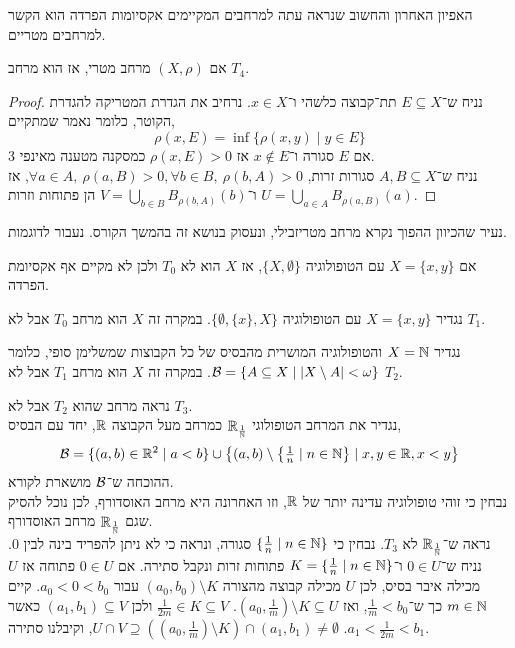 האפיון האחרון והחשוב שנראה עתה למרחבים המקיימים אקסיומות הפרדה הוא הקשר למרחבים מטריים.
\begin{proposition}
	אם $(X, \rho)$ מרחב מטרי, אז הוא מרחב $T_4$.
\end{proposition}
\begin{proof}
	נניח ש־$E \subseteq X$ תת־קבוצה כלשהי ו־$x \in X$.
	נרחיב את הגדרת המטריקה להגדרת הקוטר, כלומר נאמר שמתקיים,
	\[
		\rho(x, E) = \inf\{ \rho(x, y) \mid y \in E \}
	\]
	אם $E$ סגורה ו־$x \notin E$ אז $\rho(x, E) > 0$ כמסקנה מטענה מאינפי 3. \\
	נניח ש־$A, B \subseteq X$ סגורות זרות, $\forall a \in A,\ \rho(a, B) > 0, \forall b \in B,\ \rho(b, A) > 0$,
	אז $U = \bigcup_{a \in A} B_{\rho(a, B)}(a)$ ו־$V = \bigcup_{b \in B} B_{\rho(b, A)}(b)$ הן פתוחות וזרות.
\end{proof}
נעיר שהכיוון ההפוך נקרא מרחב מטריזבילי, ונעסוק בנושא זה בהמשך הקורס.
נעבור לדוגמות.
\begin{example}
	אם $X = \{x, y\}$ עם הטופולוגיה $\{X, \emptyset\}$, אז $X$ הוא לא $T_0$ ולכן לא מקיים אף אקסיומת הפרדה.
\end{example}
\begin{example}
	נגדיר $X = \{x, y\}$ עם הטופולוגיה $\{\emptyset, \{x\}, X\}$.
	במקרה זה $X$ הוא מרחב $T_0$ אבל לא $T_1$.
\end{example}
\begin{example}
	נגדיר $X = \mathbb{N}$ והטופולוגיה המושרית מהבסיס של כל הקבוצות שמשלימן סופי, כלומר $\mathcal{B} = \{ A \subseteq X \mid |X \setminus A| < \omega \}$.
	במקרה זה $X$ הוא מרחב $T_1$ אבל לא $T_2$.
\end{example}
\begin{example}
	נראה מרחב שהוא $T_2$ אבל לא $T_3$. \\
	נגדיר את המרחב הטופולוגי $\mathbb{R}_{\frac{1}{\mathbb{N}}}$ כמרחב מעל הקבוצה $\mathbb{R}$, יחד עם הבסיס,
	\[
		\mathcal{B}
		= \{ (a, b) \in \mathbb{R}^2 \mid a < b \}
		\cup \left\{ (a, b) \setminus \left\{ \textstyle\frac{1}{n} \mid n \in \mathbb{N} \right\} \mid x, y \in \mathbb{R}, x < y \right\}
	\]
	ההוכחה ש־$\mathcal{B}$ מושארת לקורא. \\
	נבחין כי זוהי טופולוגיה עדינה יותר של $\mathbb{R}$, וזו האחרונה היא מרחב האוסדורף, לכן נוכל להסיק שגם $\mathbb{R}_{\frac{1}{\mathbb{N}}}$ מרחב האוסדורף. \\
	נראה ש־$\mathbb{R}_{\frac{1}{\mathbb{N}}}$ לא $T_3$.
	נבחין כי $\{\frac{1}{n} \mid n \in \mathbb{N} \}$ סגורה,
	ונראה כי לא ניתן להפריד בינה לבין $0$.
	נניח ש־$0 \in U$ ו־$K = \{ \frac{1}{n} \mid n \in \mathbb{N} \}$ פתוחות זרות ונקבל סתירה.
	אם $0 \in U$ פתוחה אז $U$ מכילה איבר בסיס,
	לכן $U$ מכילה קבוצה מהצורה $(a_0, b_0) \setminus K$ עבור $a_0 < 0 < b_0$.
	קיים $m \in \mathbb{N}$ כך ש־$\frac{1}{m} < b_0$, ואז $(a_0, \frac{1}{m}) \setminus K \subseteq U$.
	$\frac{1}{2m} \in K \subseteq V$ ולכן $(a_1, b_1) \subseteq V$ כאשר $a_1 < \frac{1}{2m} < b_1$.
	$U \cap V \supseteq ((a_0, \frac{1}{m}) \setminus K) \cap (a_1, b_1) \ne \emptyset$, וקיבלנו סתירה.
\end{example}

